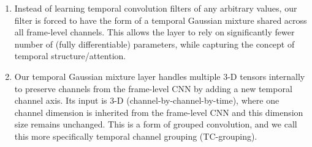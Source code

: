 \documentclass{article}
\begin{document}
\vspace{-3pt}
\begin{enumerate}

\item Instead of learning temporal convolution filters of any arbitrary values, our filter is forced to have the form of a temporal Gaussian mixture shared across all frame-level channels. This allows the layer to rely on significantly fewer number of (fully differentiable) parameters, while capturing the concept of temporal structure/attention.

\item Our temporal Gaussian mixture layer handles multiple 3-D tensors internally to preserve channels from the frame-level CNN by adding a new temporal channel axis. Its input is 3-D (channel-by-channel-by-time), where one channel dimension is inherited from the frame-level CNN and this dimension size remains unchanged. This is a form of grouped convolution, and we call this more specifically temporal channel grouping (TC-grouping).

\end{enumerate}
\vspace{-3pt}
\end{document}
